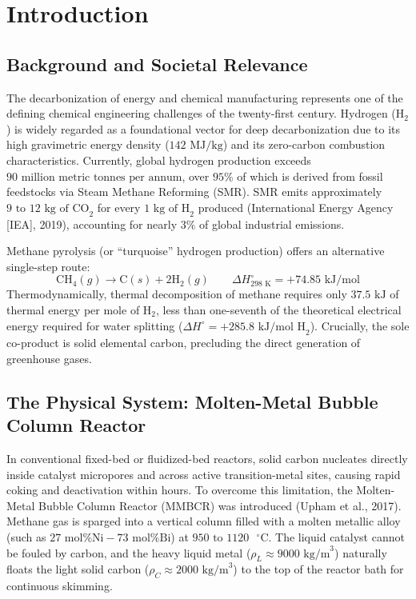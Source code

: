 \documentclass[12pt,a4paper,oneside]{report}
\begin{document}
\chapter{Introduction}
\section{Background and Societal Relevance}
The decarbonization of energy and chemical manufacturing represents one of the defining chemical engineering challenges of the twenty-first century. Hydrogen ($\text{H}_2$) is widely regarded as a foundational vector for deep decarbonization due to its high gravimetric energy density ($142\text{ MJ/kg}$) and its zero-carbon combustion characteristics. Currently, global hydrogen production exceeds $90\text{ million metric tonnes per annum}$, over $95\%$ of which is derived from fossil feedstocks via Steam Methane Reforming (SMR). SMR emits approximately $9\text{ to }12\text{ kg of CO}_2$ for every $1\text{ kg of H}_2$ produced (International Energy Agency [IEA], 2019), accounting for nearly $3\%$ of global industrial emissions.

Methane pyrolysis (or ``turquoise'' hydrogen production) offers an alternative single-step route:
\begin{equation}
\text{CH}_4(g) \longrightarrow \text{C}(s) + 2\text{H}_2(g) \qquad \Delta H^\circ_{298\text{ K}} = +74.85\text{ kJ/mol}
\end{equation}
Thermodynamically, thermal decomposition of methane requires only $37.5\text{ kJ}$ of thermal energy per mole of $\text{H}_2$, less than one-seventh of the theoretical electrical energy required for water splitting ($\Delta H^\circ = +285.8\text{ kJ/mol H}_2$). Crucially, the sole co-product is solid elemental carbon, precluding the direct generation of greenhouse gases.

\section{The Physical System: Molten-Metal Bubble Column Reactor}
In conventional fixed-bed or fluidized-bed reactors, solid carbon nucleates directly inside catalyst micropores and across active transition-metal sites, causing rapid coking and deactivation within hours. To overcome this limitation, the Molten-Metal Bubble Column Reactor (MMBCR) was introduced (Upham et al., 2017). Methane gas is sparged into a vertical column filled with a molten metallic alloy (such as $27\text{ mol\% Ni}-73\text{ mol\% Bi}$) at $950\text{ to }1120\text{ }^\circ\text{C}$. The liquid catalyst cannot be fouled by carbon, and the heavy liquid metal ($\rho_L \approx 9000\text{ kg/m}^3$) naturally floats the light solid carbon ($\rho_C \approx 2000\text{ kg/m}^3$) to the top of the reactor bath for continuous skimming.
\end{document}
